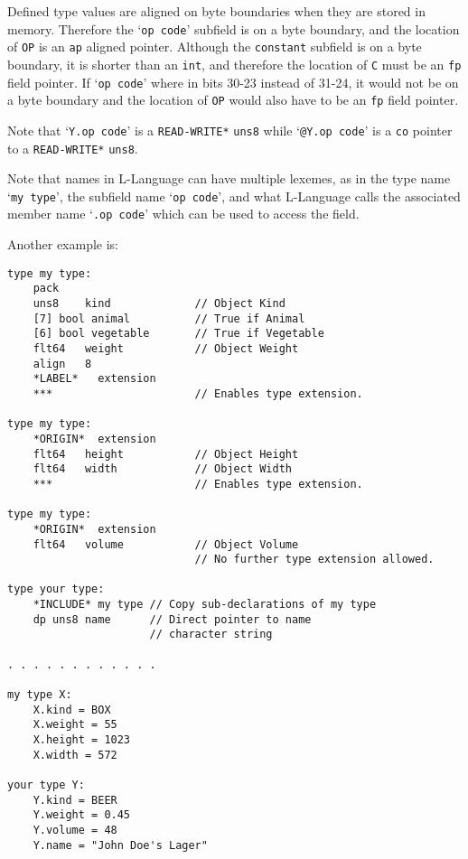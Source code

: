\documentclass[12pt]{article}
\newenvironment{indpar}[1][0.3in]%
	{\begin{list}{}%
		     {\setlength{\itemsep}{0in}%
		      \setlength{\topsep}{0in}%
		      \setlength{\parsep}{1ex}%
		      \setlength{\labelwidth}{#1}%
		      \setlength{\leftmargin}{#1}%
		      \addtolength{\leftmargin}{\labelsep}}%
	 \item}%
	{\end{list}}
\begin{document}
Defined type values are aligned on byte boundaries when
they are stored in memory.  Therefore the `{\tt op code}' subfield
is on a byte boundary, and
the location of {\tt OP} is an {\tt ap} aligned pointer.  Although
the {\tt constant} subfield is on a byte boundary, it is
shorter than an {\tt int}, and therefore the
location of {\tt C} must be an {\tt fp} field pointer.
If `{\tt op code}' where in bits 30-23 instead of 31-24, it would
not be on a byte boundary and the location of {\tt OP} would
also have to be an {\tt fp} field pointer.

Note that `{\tt Y.op code}' is a {\tt *READ-WRITE*}
{\tt uns8} while `{\tt @Y.op code}' is a {\tt co} pointer to
a {\tt *READ-WRITE*} {\tt uns8}.

Note that names in L-Language can have multiple lexemes, as in
the type name `{\tt my type}', the subfield name `{\tt op code}',
and what L-Language calls the
associated member name `{\tt .op code}' which can be used to access
the field.

Another example is:

\begin{indpar}\begin{verbatim}
type my type:
    pack
    uns8    kind             // Object Kind
    [7] bool animal          // True if Animal
    [6] bool vegetable       // True if Vegetable
    flt64   weight           // Object Weight
    align   8
    *LABEL*   extension
    ***                      // Enables type extension.

type my type:
    *ORIGIN*  extension
    flt64   height           // Object Height
    flt64   width            // Object Width
    ***                      // Enables type extension.

type my type:
    *ORIGIN*  extension
    flt64   volume           // Object Volume
                             // No further type extension allowed.

type your type:
    *INCLUDE* my type // Copy sub-declarations of my type
    dp uns8 name      // Direct pointer to name
                      // character string

. . . . . . . . . . . .

my type X:
    X.kind = BOX
    X.weight = 55
    X.height = 1023
    X.width = 572

your type Y:
    Y.kind = BEER
    Y.weight = 0.45
    Y.volume = 48
    Y.name = "John Doe's Lager"
\end{verbatim}\end{indpar}
\end{document}
